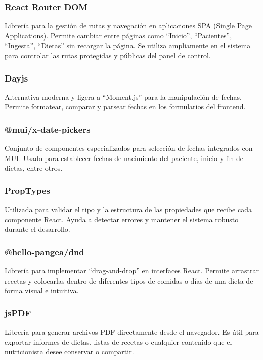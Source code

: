\subsubsection*{React Router DOM\cite{reactrouterdom}}
Librería para la gestión de rutas y navegación en aplicaciones SPA (Single Page Applications). Permite cambiar entre páginas como ``Inicio'', ``Pacientes'', ``Ingesta'', ``Dietas'' sin recargar la página. Se utiliza ampliamente en el sistema para controlar las rutas protegidas y públicas del panel de control.

\subsubsection*{Dayjs\cite{dayjs}}
Alternativa moderna y ligera a ``Moment.js'' para la manipulación de fechas. Permite formatear, comparar y parsear fechas en los formularios del frontend.

\subsubsection*{@mui/x-date-pickers\cite{muixdatepicker}}
Conjunto de componentes especializados para selección de fechas integrados con MUI. Usado para establecer fechas de nacimiento del paciente, inicio y fin de dietas, entre otros.

\subsubsection*{PropTypes\cite{propTypes}}
Utilizada para validar el tipo y la estructura de las propiedades que recibe cada componente React. Ayuda a detectar errores y mantener el sistema robusto durante el desarrollo.

\subsubsection*{@hello-pangea/dnd\cite{pangeadnd}}
Librería para implementar ``drag-and-drop'' en interfaces React. Permite arrastrar recetas y colocarlas dentro de diferentes tipos de comidas o días de una dieta de forma visual e intuitiva.

\subsubsection*{jsPDF\cite{jspdf}}
Librería para generar archivos PDF directamente desde el navegador. Es útil para exportar informes de dietas, listas de recetas o cualquier contenido que el nutricionista desee conservar o compartir.

